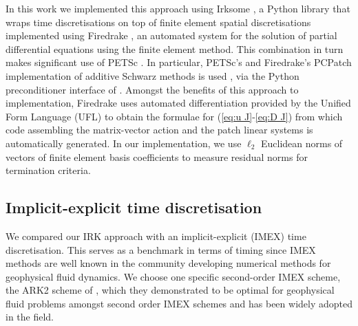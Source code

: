 \documentclass[a4paper, 12pt]{article}
\newcommand{\revisedA}[1]{#1}
\begin{document}
\revisedA{ In this work we implemented this approach using Irksome
  \citep{farrell2021irksome,kirby2024extending}, a Python library that
  wraps time discretisations on top of finite element spatial
  discretisations implemented using Firedrake
  \citep{FiredrakeUserManual}, an automated system for the solution of
  partial differential equations using the finite element method.
  This combination in turn makes significant use of PETSc
  \citep{dalcin2011parallel,balay2019petsc}. In particular, PETSc's
  and Firedrake's PCPatch implementation of additive Schwarz methods
  is used \citep{farrell2021pcpatch}, via the Python preconditioner
  interface of \citet{kirby2018solver}.  Amongst the benefits of this
  approach to implementation, Firedrake uses automated differentiation
  provided by the Unified Form Language (UFL) \citep{alnaes2012ufl} to
  obtain the formulae for (\ref{eq:u J}-\ref{eq:D J}) from which code
  assembling the matrix-vector action and the patch linear systems is
  automatically generated. In our implementation, we use $\ell_2$
  Euclidean norms of vectors of finite element basis coefficients to
  measure residual norms for termination criteria.  }

\subsection{Implicit-explicit time discretisation}

We compared our IRK approach with an
implicit-explicit (IMEX) time discretisation. This serves as a
benchmark in terms of timing since IMEX methods are well known in the
community developing numerical methods for geophysical fluid dynamics.
We choose one specific second-order IMEX scheme, the ARK2 scheme
of \citet{giraldo2013implicit}, which they demonstrated to be optimal
for geophysical fluid problems amongst second order IMEX schemes and has
been widely adopted in the field.
\end{document}

